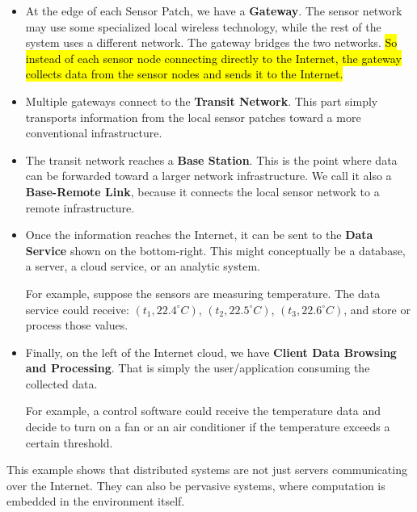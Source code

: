\begin{examplebox}
\begin{itemize}
        \item At the edge of each Sensor Patch, we have a \textbf{Gateway}. The sensor network may use some specialized local wireless technology, while the rest of the system uses a different network. The gateway bridges the two networks. \hl{So instead of each sensor node connecting directly to the Internet, the gateway collects data from the sensor nodes and sends it to the Internet.}

        \item Multiple gateways connect to the \textbf{Transit Network}. This part simply transports information from the local sensor patches toward a more conventional infrastructure.

        \item The transit network reaches a \textbf{Base Station}. This is the point where data can be forwarded toward a larger network infrastructure. We call it also a \textbf{Base-Remote Link}, because it connects the local sensor network to a remote infrastructure.

        \item Once the information reaches the Internet, it can be sent to the \textbf{Data Service} shown on the bottom-right. This might conceptually be a database, a server, a cloud service, or an analytic system.

            For example, suppose the sensors are measuring temperature. The data service could receive: $(t_1, 22.4^\circ C)$, $(t_2, 22.5^\circ C)$, $(t_3, 22.6^\circ C)$, and store or process those values.

        \item Finally, on the left of the Internet cloud, we have \textbf{Client Data Browsing and Processing}. That is simply the user/application consuming the collected data.

            For example, a control software could receive the temperature data and decide to turn on a fan or an air conditioner if the temperature exceeds a certain threshold.
    \end{itemize}
    This example shows that distributed systems are not just servers communicating over the Internet. They can also be pervasive systems, where computation is embedded in the environment itself.
\end{examplebox}

